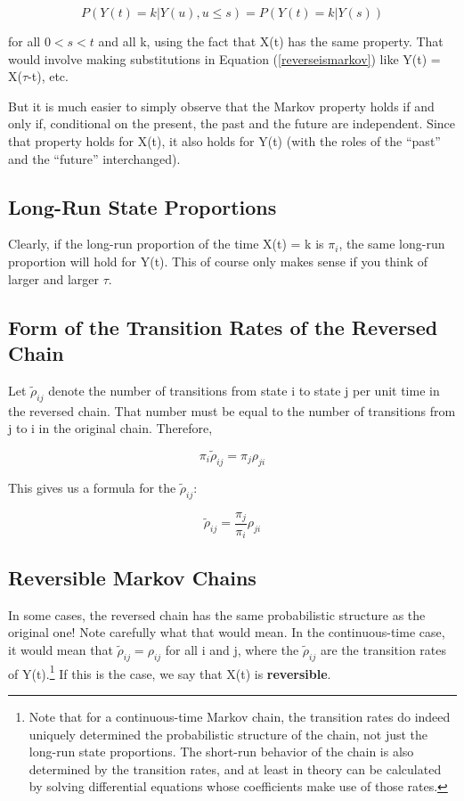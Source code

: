 \begin{equation}
\label{reverseismarkov}
P \left (Y(t) = k | Y(u), u \leq s \right ) = P \left (Y(t) = k | Y(s) \right )
\end{equation}

for all $0 < s < t$ and all k, using the fact that X(t) has the same
property.  That would involve making substitutions in Equation
(\ref{reverseismarkov}) like Y(t) = X($\tau$-t), etc.  

But it is much easier to simply observe that the Markov property holds
if and only if, conditional on the present, the past and the future are
independent.  Since that property holds for X(t), it also holds for Y(t)
(with the roles of the ``past'' and the ``future'' interchanged).

\subsection{Long-Run State Proportions}

Clearly, if the long-run proportion of the time X(t) = k is $\pi_i$, the
same long-run proportion will hold for Y(t).  This of course only makes
sense if you think of larger and larger $\tau$.

\subsection{Form of the Transition Rates of the Reversed Chain}

Let $\tilde{\rho}_{ij}$ denote the number of transitions from state i to
state j per unit time in the reversed chain.  That number must be equal
to the number of transitions from j to i in the original chain.
Therefore,

\begin{equation}
\label{newrates}
\pi_i \tilde{\rho}_{ij} = \pi_j \rho_{ji}
\end{equation}

This gives us a formula for the $\tilde{\rho}_{ij}$:

\begin{equation}
\tilde{\rho}_{ij} = \frac{\pi_j}{\pi_i} \rho_{ji}
\end{equation}

\subsection{Reversible Markov Chains}

In some cases, the reversed chain has the same probabilistic structure
as the original one!  Note carefully what that would mean.  In the
continuous-time case, it would mean that $\tilde{\rho}_{ij} = \rho_{ij}$
for all i and j, where the $\tilde{\rho}_{ij}$ are the transition rates
of Y(t).\footnote{Note that for a continuous-time Markov chain, the
transition rates do indeed uniquely determined the probabilistic
structure of the chain, not just the long-run state proportions.  The
short-run behavior of the chain is also determined by the transition
rates, and at least in theory can be calculated by solving differential
equations whose coefficients make use of those rates.} If this is the
case, we say that X(t) is {\bf reversible}.


